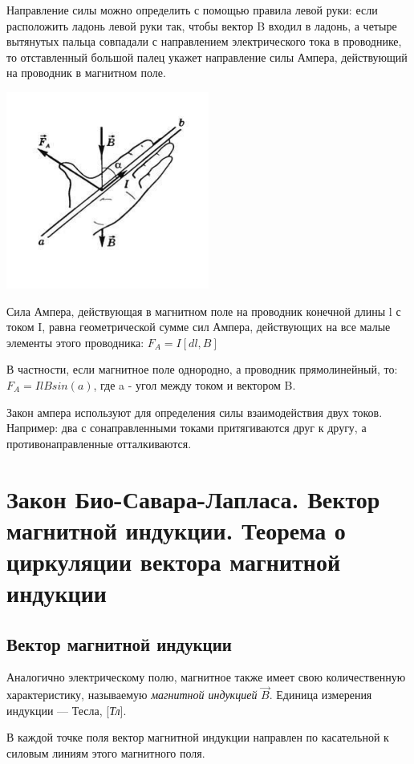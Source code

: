 \documentclass[12pt]{report}
\begin{document}
Направление силы можно определить с помощью правила левой руки:
если расположить ладонь левой руки так, чтобы вектор B входил в ладонь, а четыре вытянутых пальца совпадали с направлением электрического тока в проводнике, то отставленный большой палец укажет направление силы Ампера, действующий на проводник в магнитном поле.

\begin{center}
    \includegraphics{graphics/17.png}
\end{center}

Сила Ампера, действующая в магнитном поле на проводник конечной длины l с током I, равна геометрической сумме сил Ампера, действующих на все малые элементы этого проводника:
$F_A = I[dl, B]$

В частности, если магнитное поле однородно, а проводник прямолинейный, то:
$F_A = IlBsin(a)$, где a - угол между током и вектором B.

Закон ампера используют для определения силы взаимодействия двух токов. Например: два с сонаправленными токами притягиваются друг к другу, а противонаправленные отталкиваются.


\setcounter{section}{17}

\section{Закон Био-Савара-Лапласа. Вектор магнитной индукции. Теорема о циркуляции вектора магнитной индукции}
\subsection*{Вектор магнитной индукции}
Аналогично электрическому полю, магнитное также имеет свою количественную характеристику,
называемую \textit{магнитной индукцией} $\vec{B}$.
Единица измерения индукции --- Тесла, [\textit{Тл}].

В каждой точке поля вектор магнитной индукции направлен по касательной
к силовым линиям этого магнитного поля.
\end{document}

